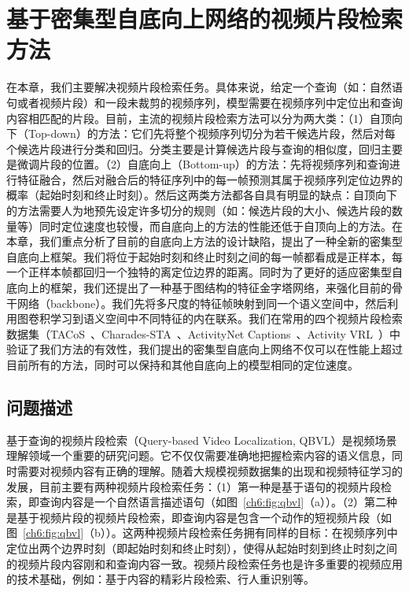 \chapter{基于密集型自底向上网络的视频片段检索方法}

在本章，我们主要解决视频片段检索任务。具体来说，给定一个查询（如：自然语句或者视频片段）和一段未裁剪的视频序列，模型需要在视频序列中定位出和查询内容相匹配的片段。目前，主流的视频片段检索方法可以分为两大类：（1）自顶向下（Top-down）的方法：它们先将整个视频序列切分为若干候选片段，然后对每个候选片段进行分类和回归。分类主要是计算候选片段与查询的相似度，回归主要是微调片段的位置。（2）自底向上（Bottom-up）的方法：先将视频序列和查询进行特征融合，然后对融合后的特征序列中的每一帧预测其属于视频序列定位边界的概率（起始时刻和终止时刻）。然后这两类方法都各自具有明显的缺点：自顶向下的方法需要人为地预先设定许多切分的规则（如：候选片段的大小、候选片段的数量等）同时定位速度也较慢，而自底向上的方法的性能还低于自顶向上的方法。在本章，我们重点分析了目前的自底向上方法的设计缺陷，提出了一种全新的密集型自底向上框架。我们将位于起始时刻和终止时刻之间的每一帧都看成是正样本，每一个正样本帧都回归一个独特的离定位边界的距离。同时为了更好的适应密集型自底向上的框架，我们还提出了一种基于图结构的特征金字塔网络，来强化目前的骨干网络（backbone）。我们先将多尺度的特征帧映射到同一个语义空间中，然后利用图卷积学习到语义空间中不同特征的内在联系。我们在常用的四个视频片段检索数据集（TACoS~\cite{regneri2013grounding}、Charades-STA~\cite{gao2017tall}、ActivityNet Captions~\cite{krishna2017dense}、Activity VRL~\cite{feng2018video}）中验证了我们方法的有效性，我们提出的密集型自底向上网络不仅可以在性能上超过目前所有的方法，同时可以保持和其他自底向上的模型相同的定位速度。


\section{问题描述}

基于查询的视频片段检索（Query-based Video Localization, QBVL）是视频场景理解领域一个重要的研究问题。它不仅仅需要准确地把握检索内容的语义信息，同时需要对视频内容有正确的理解。随着大规模视频数据集的出现和视频特征学习的发展，目前主要有两种视频片段检索任务：（1）第一种是基于语句的视频片段检索，即查询内容是一个自然语言描述语句（如图~\ref{ch6:fig:qbvl}（a））。（2）第二种是基于视频片段的视频片段检索，即查询内容是包含一个动作的短视频片段（如图~\ref{ch6:fig:qbvl}（b））。这两种视频片段检索任务拥有同样的目标：在视频序列中定位出两个边界时刻（即起始时刻和终止时刻），使得从起始时刻到终止时刻之间的视频片段内容刚和和查询内容一致。视频片段检索任务也是许多重要的视频应用的技术基础，例如：基于内容的精彩片段检索、行人重识别等。

